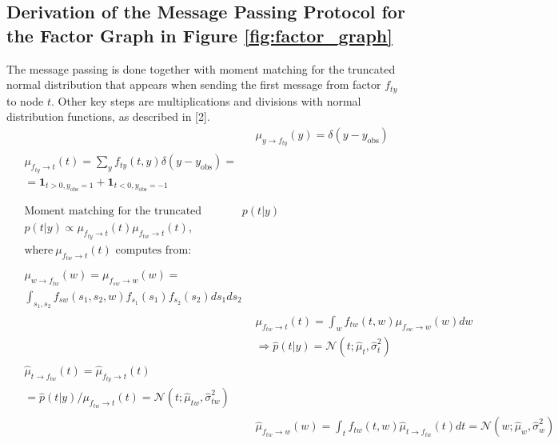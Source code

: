 \documentclass{article}
\begin{document}
	\subsection{Derivation of the Message Passing Protocol for the Factor Graph in Figure \ref{fig:factor_graph}}
	\label{app:message_passing}
	The message passing is done together with moment matching for the truncated normal distribution that appears when sending the first message from factor $ f_{ty} $ to node $ t $. Other key steps are multiplications and divisions with normal distribution functions, as described in [2].
	\begin{subequations}
		\begin{align}
		&\mu_{y\rightarrow f_{ty}}(y)=\delta(y-y_\text{obs})\\
		\begin{split}
		&\mu_{f_{ty}\rightarrow t}(t) = \sum_y f_{ty}(t,y)\delta(y-y_{\text{obs}})=\\
		&=\bm{1}_{t>0,y_\text{obs}=1}+\bm{1}_{t<0,y_\text{obs}=-1}\\
		\end{split}\\
		\begin{split}
		&\text{Moment matching for the truncated Gaussian: }p(t|y)\\
		&p(t|y) \propto \mu_{f_{ty}\rightarrow t}(t)\mu_{f_{tw}\rightarrow t}(t),\\
		&\text{where}~\mu_{f_{tw}\rightarrow t}(t)\text{ computes from:}
		\end{split}\\
		\begin{split}
		&\mu_{w\rightarrow f_{tw}}(w)=\mu_{f_{sw}\rightarrow w}(w)= \\
		&\int_{s_1, s_2}f_{sw}(s_1,s_2,w)f_{s_1}(s_1)f_{s_2}(s_2)ds_1ds_2
		\end{split}\\
		&\mu_{f_{tw}\rightarrow t}(t) = \int_w f_{tw}(t,w)\mu_{f_{sw}\rightarrow w}(w)dw\\
		&\Rightarrow \hat{p}(t|y) = \mathcal{N}(t;\hat{\mu}_t, \hat{\sigma}_t^2)\\
		\begin{split}
		&\hat{\mu}_{t\rightarrow f_{tw}}(t)=\hat{\mu}_{f_{ty}\rightarrow t}(t)\\
		&= \hat{p}(t|y)/\mu_{f_{tw}\rightarrow t}(t)=\mathcal{N}(t; \hat{\mu}_{tw}, \hat{\sigma}_{tw}^2)
		\end{split}\\
		& \hat{\mu}_{f_{tw}\rightarrow w}(w) = \int_t f_{tw}(t,w)\hat{\mu}_{t\rightarrow f_{tw}}(t)dt=\mathcal{N}(w; \hat{\mu}_{w}, \hat{\sigma}_{w}^2)\\

\end{align}
\end{subequations}
\end{document}
